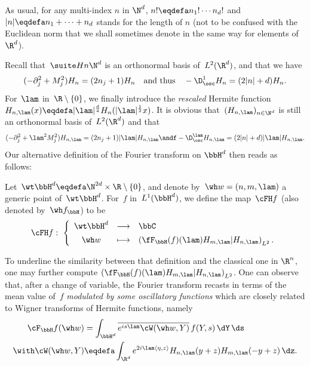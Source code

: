 As usual, for any multi-index $n$ in $\N^d$, $n!\eqdefa n_1!\dotsm n_d!$ and $|n|\eqdefa n_1+\dots+n_d$ stands for the length of $n$ (not to be confused with the Euclidean norm that we shall sometimes denote in the same way for elements of $\R^d$).

Recall that~$ \suite H n {\N^d}$ is an orthonormal basis of~$L^2(\R^d)$, and that we have
\[
(-\partial_j^2+M_j^2) H_n =(2n_j+1) H_n \quad\hbox{and thus}\quad -\D_{\osc}^1 H_n = (2|n|+d) H_n.
\]
For~$\lam$ in~$\R\setminus\{0\}$, we finally introduce the \emph{rescaled} Hermite function~$H_{n,\lam} (x)\eqdefa |\lam|^{\frac d 4} H_n(|\lam|^{\frac 12} x)$. It is obvious that~$(H_{n,\lam})_{n\in \N^d}$ is still an orthonormal basis of~$L^2(\R^d)$ and that
\begin{equation}\label{relationsHHermiteD}
(-\partial_j^2+\lam^2M_j^2) H_{n,\lam} =(2n_j+1)|\lam| H_{n,\lam} \andf -\D_{\osc}^\lam H_{n,\lam} = (2|n|+d)|\lam| H_{n,\lam}.
\end{equation}
Our alternative definition of the Fourier transform on $\bbH^d$ then reads as follows:

\begin{defi}\label{definFouriercoeffH}
Let~$\wt \bbH ^d\eqdefa \N^{2d}\times \R\setminus\{0\}$, and denote by~$\wh w=(n,m,\lam)$ a generic point of~$\wt \bbH^d$. For~$f$ in~$L^1(\bbH^d)$, we define the map~$\cFH f$ (also denoted by~$\wh f_\bbH$) to be
\[
\cFH f: \
\left\{
\begin{array}{ccl}
\wt \bbH ^d & \longrightarrow & \bbC\\[1ex]
\wh w & \longmapsto &
\left(\fF_{\bbH}(f)(\lam) H_{m,\lam} |H_{n,\lam}\right)_{L^2}.
\end{array}
\right.
\]
\end{defi}

To underline the similarity between that definition and the classical one in $\R^n$, one may further compute $\left(\fF_{\bbH}(f)(\lam) H_{m,\lam} |H_{n,\lam}\right)_{L^2}$. One can observe that, after a change of variable, the Fourier transform recasts in terms of the mean value of~$f$ \emph{modulated by some oscillatory functions} which are closely related to Wigner transforms of Hermite functions, namely
\begin{align}\label{definFourierWigner}
\cF_\bbH f(\wh w) &= \int_{\bbH^d} \overline{e^{is\lam} \cW(\wh w,Y)}\, f(Y,s) \,\dY\,\ds
\\ \with \label{definWigner}
\cW(\wh w,Y) & \eqdefa \int_{\R^d} e^{2i\lam\langle \eta,z\rangle} H_{n,\lam} (y+z) H_{m,\lam} (-y+z) \,\dz.
\end{align}

